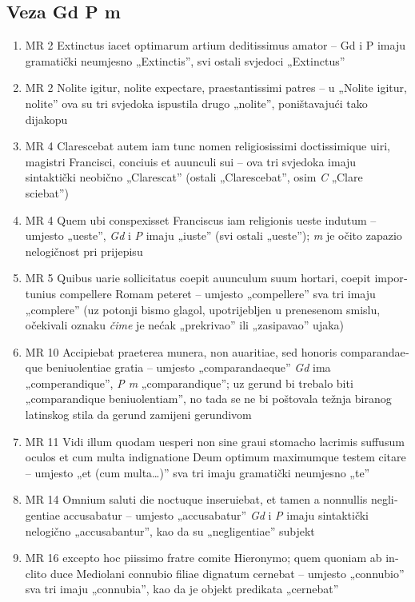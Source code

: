 \documentclass[a5paper,twoside]{article}
\begin{document}
\subsection{Veza Gd P m}

\begin{enumerate}[label=\alph*)]
\item MR 2 \textlatin{Extinctus iacet optimarum artium deditissimus amator} – Gd i P imaju gramatički neumjesno „Extinctis”, svi ostali svjedoci „Extinctus”
\item MR 2 \textlatin{Nolite igitur, nolite expectare, praestantissimi patres} – u „Nolite igitur, nolite” ova su tri svjedoka ispustila drugo „nolite”, poništavajući tako dijakopu
\item MR 4 \textlatin{Clarescebat autem iam tunc nomen religiosissimi doctissimique uiri, magistri Francisci, conciuis et auunculi sui} – ova tri svjedoka imaju sintaktički neobično „Clarescat” (ostali „Clarescebat”, osim \textit{C} „Clare sciebat”)
\item MR 4 \textlatin{Quem ubi conspexisset Franciscus iam religionis ueste indutum} – umjesto „ueste”, \textit{Gd} i \textit{P} imaju „iuste” (svi ostali „ueste”); \textit{m} je očito zapazio nelogičnost pri prijepisu
\item MR 5 \textlatin{Quibus uarie sollicitatus coepit auunculum suum hortari, coepit importunius compellere Romam peteret} – umjesto „compellere” sva tri imaju „complere” (uz potonji bismo glagol, upotrijebljen u prenesenom smislu, očekivali oznaku \textit{čime} je nećak „prekrivao” ili „zasipavao” ujaka)
\item MR 10 \textlatin{Accipiebat praeterea munera, non auaritiae, sed honoris comparandaeque beniuolentiae gratia} – umjesto „comparandaeque” \textit{Gd} ima „comperandique”, \textit{P m} „comparandique”; uz gerund bi trebalo biti „comparandique beniuolentiam”, no tada se ne bi poštovala težnja biranog latinskog stila da gerund zamijeni gerundivom
\item MR 11 \textlatin{Vidi illum quodam uesperi non sine graui stomacho lacrimis suffusum oculos et cum multa indignatione Deum optimum maximumque testem citare} – umjesto „et (cum multa\dots)” sva tri imaju gramatički neumjesno „te”
\item MR 14 \textlatin{Omnium saluti die noctuque inseruiebat, et tamen a nonnullis negligentiae accusabatur} – umjesto „accusabatur” \textit{Gd} i \textit{P} imaju sintaktički nelogično „accusabantur”, kao da su „negligentiae” subjekt
\item MR 16 \textlatin{excepto hoc piissimo fratre comite Hieronymo; quem quoniam ab inclito duce Mediolani connubio filiae dignatum cernebat} – umjesto „connubio” sva tri imaju „connubia”, kao da je objekt predikata „cernebat”

\end{enumerate}
\end{document}
